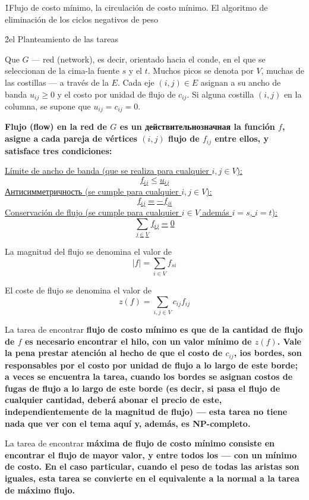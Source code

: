 \h1{Flujo de costo mínimo, la circulación de costo mínimo. El algoritmo de eliminación de los ciclos negativos de peso}

\h2{el Planteamiento de las tareas}

Que $G$ --- red (network), es decir, orientado hacia el conde, en el que se seleccionan de la cima-la fuente $s$ y el $t$. Muchos picos se denota por $V$, muchas de las costillas --- a través de la $E$. Cada eje $(i,j) \in E$ asignan a su ancho de banda $u_{ij} \ge 0$ y el costo por unidad de flujo de $c_{ij}$. Si alguna costilla $(i,j)$ en la columna, se supone que $u_{ij} = c_{ij} = 0$.

\bf{Flujo} (flow) en la red de $G$ es un действительнозначная la función $f$, asigne a cada pareja de vértices $(i,j)$ flujo de $f_{ij}$ entre ellos, y satisface tres condiciones:

\ul{
\li Límite de ancho de banda (que se realiza para cualquier $i, j \in V$):
$$ f_{ij} \le u_{ij} $$
\li Антисимметричность (se cumple para cualquier $i, j \in V$):
$$ f_{ij} = - f_{ji} $$
\li Conservación de flujo (se cumple para cualquier $i \in V$ además $i=s$, $i=t$):
$$ \sum_{j \in V} f_{ij} = 0 $$
}

La magnitud del flujo se denomina el valor de
$$ |f| = \sum_{i \in V} f_{si} $$

El coste de flujo se denomina el valor de
$$ z(f) = \sum_{i,j \in V} c_{ij} f_{ij} $$

La tarea de encontrar \bf{flujo de costo mínimo} es que de la cantidad de flujo de $f$ es necesario encontrar el hilo, con un valor mínimo de $z(f)$. Vale la pena prestar atención al hecho de que el costo de $c_{ij}$, ios bordes, son responsables por el costo por unidad de flujo a lo largo de este borde; a veces se encuentra la tarea, cuando los bordes se asignan costos de fugas de flujo a lo largo de este borde (es decir, si pasa el flujo de cualquier cantidad, deberá abonar el precio de este, independientemente de la magnitud de flujo) --- esta tarea no tiene nada que ver con el tema aquí y, además, es NP-completo.

La tarea de encontrar \bf{máxima de flujo de costo mínimo} consiste en encontrar el flujo de mayor valor, y entre todos los --- con un mínimo de costo. En el caso particular, cuando el peso de todas las aristas son iguales, esta tarea se convierte en el equivalente a la normal a la tarea de máximo flujo.

